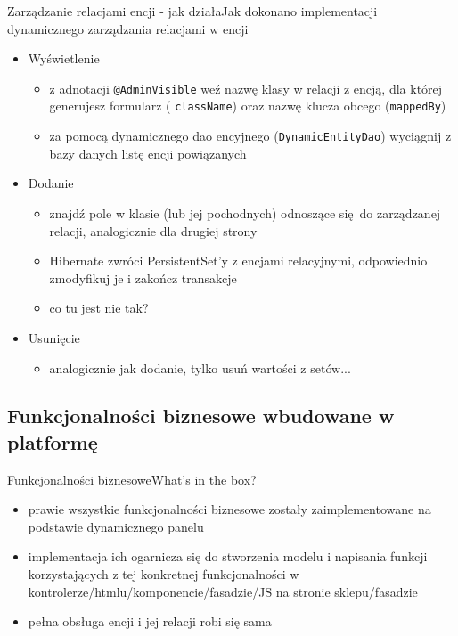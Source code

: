 \documentclass[polish,xcolor=table,9pt,aspectratio=1610,hyperref={pdfpagemode=FullScreen}]{beamer}
\begin{document}
\begin{frame}{Zarządzanie relacjami encji - jak działa}{Jak dokonano implementacji dynamicznego zarządzania relacjami w encji}
\begin{itemize}
	\item<1-> Wyświetlenie 
	\begin{itemize}
		\item<1-> z adnotacji \texttt{@AdminVisible} weź nazwę klasy w relacji z encją, dla której generujesz formularz ( \texttt{className}) oraz nazwę klucza obcego (\texttt{mappedBy})
		\item<1-> za pomocą dynamicznego dao encyjnego (\texttt{DynamicEntityDao}) wyciągnij z bazy danych listę encji powiązanych
	\end{itemize}
	\item<1-> Dodanie 
	\begin{itemize}
		\item<1-> znajdź pole w klasie (lub jej pochodnych) odnoszące się do zarządzanej relacji, analogicznie dla drugiej strony
		\item<1-> Hibernate zwróci PersistentSet'y z encjami relacyjnymi, odpowiednio zmodyfikuj je i zakończ transakcje
		\item<1-> co tu jest nie tak?
	\end{itemize}
	\item<1-> Usunięcie
		\begin{itemize}
			\item<1-> analogicznie jak dodanie, tylko usuń wartości z setów...
		\end{itemize}
\end{itemize}
\end{frame}

\subsection{Funkcjonalności biznesowe wbudowane w platformę}

\begin{frame}{Funkcjonalności biznesowe}{What's in the box?}
\begin{itemize}
	\item<1-> prawie wszystkie funkcjonalności biznesowe zostały zaimplementowane na podstawie dynamicznego panelu
	\item<1-> implementacja ich ogarnicza się do stworzenia modelu i napisania funkcji korzystających z tej konkretnej funkcjonalności w kontrolerze/htmlu/komponencie/fasadzie/JS na stronie sklepu/fasadzie
	\item<1-> pełna obsługa encji i jej relacji robi się sama
\end{itemize}
\end{frame}
\end{document}
